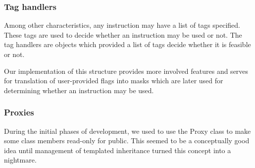 \subsubsection{Tag handlers}
  Among other characteristics, any instruction may have a list of tags specified. These tags are used to decide whether an instruction may be used or not. The tag handlers are objects which provided a list of tags decide whether it is feasible or not. 

  
  Our implementation of this structure provides more involved features and serves for translation of user-provided flags into masks which are later used for determining whether an instruction may be used.

\subsubsection{Proxies}
  During the initial phases of development, we used to use the Proxy class to make some class members read-only for public. This seemed to be a conceptually good idea until management of templated inheritance turned this concept into a nightmare. 

